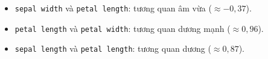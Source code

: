 \begin{ynghia}[title={Đọc biểu đồ}]
\begin{itemize}
  \item \texttt{sepal width} và \texttt{petal length}: tương quan âm vừa ($\approx -0{,}37$).
  \item \texttt{petal length} và \texttt{petal width}: tương quan dương mạnh ($\approx 0{,}96$).
  \item \texttt{sepal length} và \texttt{petal length}: tương quan dương ($\approx 0{,}87$).
\end{itemize}
\end{ynghia}

\begin{vidu}[title={Output}]
\end{vidu}
